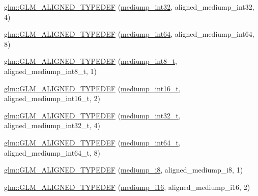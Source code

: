 \begin{DoxyCompactItemize}
\item 
\mbox{\hyperlink{group__gtx__type__aligned_ga0680cd3b5d4e8006985fb41a4f9b57af}{glm\+::\+G\+L\+M\+\_\+\+A\+L\+I\+G\+N\+E\+D\+\_\+\+T\+Y\+P\+E\+D\+EF}} (\mbox{\hyperlink{group__gtc__type__precision_ga0660a752402702f420f13c686a7fff29}{mediump\+\_\+int32}}, aligned\+\_\+mediump\+\_\+int32, 4)
\item 
\mbox{\hyperlink{group__gtx__type__aligned_gad9e5babb1dd3e3531b42c37bf25dd951}{glm\+::\+G\+L\+M\+\_\+\+A\+L\+I\+G\+N\+E\+D\+\_\+\+T\+Y\+P\+E\+D\+EF}} (\mbox{\hyperlink{group__gtc__type__precision_ga603c695fe5cd677d3f72a81343e19a74}{mediump\+\_\+int64}}, aligned\+\_\+mediump\+\_\+int64, 8)
\item 
\mbox{\hyperlink{group__gtx__type__aligned_ga353fd9fa8a9ad952fcabd0d53ad9a6dd}{glm\+::\+G\+L\+M\+\_\+\+A\+L\+I\+G\+N\+E\+D\+\_\+\+T\+Y\+P\+E\+D\+EF}} (\mbox{\hyperlink{group__gtc__type__precision_ga626ac5f73d3538e62a879d6c56abfb36}{mediump\+\_\+int8\+\_\+t}}, aligned\+\_\+mediump\+\_\+int8\+\_\+t, 1)
\item 
\mbox{\hyperlink{group__gtx__type__aligned_ga2196442c0e5c5e8c77842de388c42521}{glm\+::\+G\+L\+M\+\_\+\+A\+L\+I\+G\+N\+E\+D\+\_\+\+T\+Y\+P\+E\+D\+EF}} (\mbox{\hyperlink{group__gtc__type__precision_ga478fab608cf43040013d719a3e03b194}{mediump\+\_\+int16\+\_\+t}}, aligned\+\_\+mediump\+\_\+int16\+\_\+t, 2)
\item 
\mbox{\hyperlink{group__gtx__type__aligned_ga1284488189daf897cf095c5eefad9744}{glm\+::\+G\+L\+M\+\_\+\+A\+L\+I\+G\+N\+E\+D\+\_\+\+T\+Y\+P\+E\+D\+EF}} (\mbox{\hyperlink{group__gtc__type__precision_gafd9b4bd9e4465aec63351b59100692c4}{mediump\+\_\+int32\+\_\+t}}, aligned\+\_\+mediump\+\_\+int32\+\_\+t, 4)
\item 
\mbox{\hyperlink{group__gtx__type__aligned_ga73fdc86a539808af58808b7c60a1c4d8}{glm\+::\+G\+L\+M\+\_\+\+A\+L\+I\+G\+N\+E\+D\+\_\+\+T\+Y\+P\+E\+D\+EF}} (\mbox{\hyperlink{group__gtc__type__precision_ga555a2f85641550c232db473a9bb981f7}{mediump\+\_\+int64\+\_\+t}}, aligned\+\_\+mediump\+\_\+int64\+\_\+t, 8)
\item 
\mbox{\hyperlink{group__gtx__type__aligned_gafafeea923e1983262c972e2b83922d3b}{glm\+::\+G\+L\+M\+\_\+\+A\+L\+I\+G\+N\+E\+D\+\_\+\+T\+Y\+P\+E\+D\+EF}} (\mbox{\hyperlink{group__gtc__type__precision_ga28a8b5fd51072680bb55178c17cc7411}{mediump\+\_\+i8}}, aligned\+\_\+mediump\+\_\+i8, 1)
\item 
\mbox{\hyperlink{group__gtx__type__aligned_ga4b35ca5fe8f55c9d2fe54fdb8d8896f4}{glm\+::\+G\+L\+M\+\_\+\+A\+L\+I\+G\+N\+E\+D\+\_\+\+T\+Y\+P\+E\+D\+EF}} (\mbox{\hyperlink{group__gtc__type__precision_ga8454fc6a82c7bb787d0ac9663e08f63d}{mediump\+\_\+i16}}, aligned\+\_\+mediump\+\_\+i16, 2)

\end{DoxyCompactItemize}

